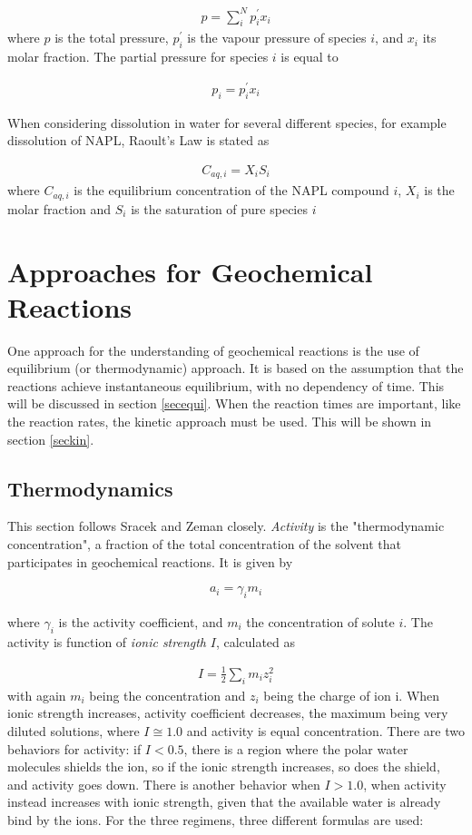 \documentclass[11pt,twoside]{report}
\begin{document}
\begin{align}
   p = \sum_{i}^{N} p_{i}^{'}x_{i}
\end{align}
where $p$ is the total pressure, $p_{i}^{'}$ is the vapour pressure of species $i$, and $x_{i}$ its molar fraction. The partial pressure for species $i$ is equal to 

\begin{align}
   p_{i} = p_{i}^{'}x_{i}
\end{align}

When considering dissolution in water for several different species, for example dissolution of NAPL, Raoult's Law is stated as

\begin{align}
   C_{aq,i} = X_{i}S_{i}
\end{align}
where $C_{aq,i}$ is the equilibrium concentration of the NAPL compound $i$, $X_{i}$ is the molar fraction and $S_{i}$ is the saturation of pure species $i$


\section{Approaches for Geochemical Reactions}
One approach for the understanding of geochemical reactions is the use of equilibrium (or thermodynamic) approach. It is based on the assumption that the reactions achieve instantaneous equilibrium, with no dependency of time. This will be discussed in section \eqref{secequi}. When the reaction times are important, like the reaction rates, the kinetic approach must be used. This will be shown in section \eqref{seckin}. 

\subsection{Thermodynamics}
This section follows Sracek and Zeman closely\cite{sracek}. \textit{Activity} is the "thermodynamic concentration", a fraction of the total concentration of the solvent that participates in geochemical reactions. It is given by

\begin{align}
   a_{i} = \gamma_{i}m_{i}
\end{align}

where $\gamma_{i}$ is the activity coefficient, and $m_{i}$ the concentration of solute $i$. The activity is function of \textit{ionic strength} $I$, calculated as

\begin{align}
   I = \frac{1}{2}\sum_{i}m_{i}z_{i}^{2}
\end{align}
with again $m_{i}$ being the concentration and $z_{i}$ being the charge of ion i. When ionic strength increases, activity coefficient decreases, the maximum being very diluted solutions, where $I \cong 1.0$ and activity is equal concentration. There are two behaviors for activity: if $I < 0.5$, there is a region where the polar water molecules shields the ion, so if the ionic strength increases, so does the shield, and activity goes down. There is another behavior when $I > 1.0$, when activity instead increases with ionic strength, given that the available water is already bind by the ions. 
For the three regimens, three different formulas are used:
\end{document}
